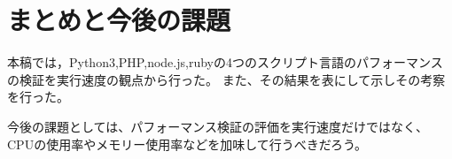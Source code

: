 \chapter{まとめと今後の課題}
\label{cha:conclusion}

 本稿では，Python3,PHP,node.js,rubyの4つのスクリプト言語のパフォーマンスの検証を実行速度の観点から行った。
 また、その結果を表にして示しその考察を行った。

 今後の課題としては、パフォーマンス検証の評価を実行速度だけではなく、CPUの使用率やメモリー使用率などを加味して行うべきだろう。
